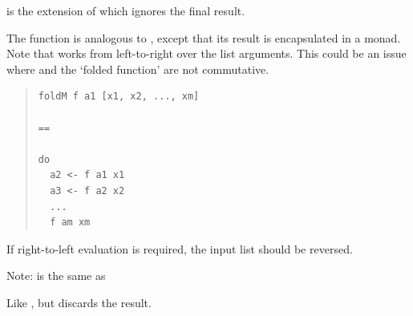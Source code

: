 \begin{haddockdesc}
\item[\begin{tabular}{@{}l}
zipWithM{\char '137} :: Applicative m => (a -> b -> m c) -> {\char 91}a{\char 93} -> {\char 91}b{\char 93} -> m ()
\end{tabular}]
{\haddockbegindoc
{} is the extension of  which ignores the final result.\par}
\end{haddockdesc}
\begin{haddockdesc}
\item[\begin{tabular}{@{}l}
foldM :: (Foldable t, Monad m) => (b -> a -> m b) -> b -> t a -> m b
\end{tabular}]
{\haddockbegindoc
The  function is analogous to , except that its result is
encapsulated in a monad. Note that  works from left-to-right over
the list arguments. This could be an issue where \haddocktt{(\haddockid{>>})} and the `folded
function' are not commutative.\par
\begin{quote}
{\haddockverb\begin{verbatim}
foldM f a1 [x1, x2, ..., xm]

==

do
  a2 <- f a1 x1
  a3 <- f a2 x2
  ...
  f am xm\end{verbatim}}
\end{quote}
If right-to-left evaluation is required, the input list should be reversed.\par
Note:  is the same as \par}
\end{haddockdesc}
\begin{haddockdesc}
\item[\begin{tabular}{@{}l}
foldM{\char '137} :: (Foldable t, Monad m) => (b -> a -> m b) -> b -> t a -> m ()
\end{tabular}]
{\haddockbegindoc
Like , but discards the result.\par}
\end{haddockdesc}
